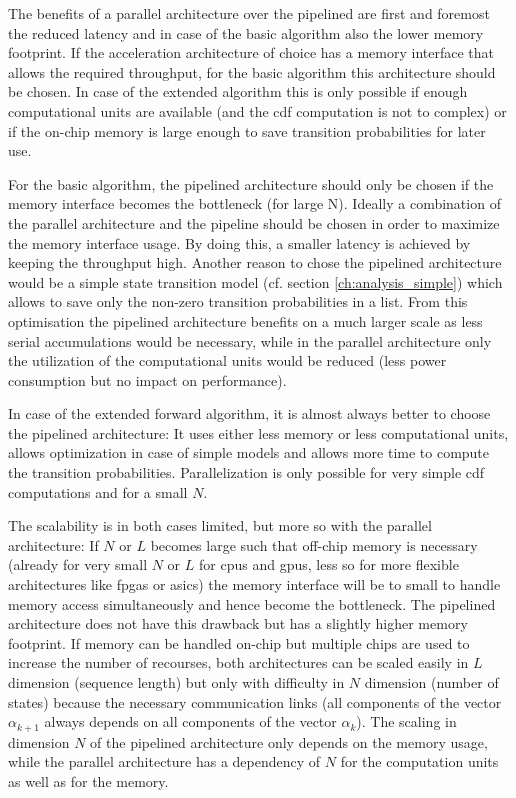 \documentclass[mscthesis]{usiinfthesis}
\begin{document}
The benefits of a parallel architecture over the pipelined are first and
foremost the reduced latency and in case of the basic algorithm also the lower
memory footprint. If the acceleration architecture of choice has a memory
interface that allows the required throughput, for the basic algorithm this
architecture should be chosen. In case of the extended algorithm this is only
possible if enough computational units are available (and the \gls{cdf} computation
is not to complex) or if the on-chip memory is large enough to save transition
probabilities for later use.

For the basic algorithm, the pipelined architecture should only be chosen if
the memory interface becomes the bottleneck (for large N). Ideally
a combination of the parallel architecture and the pipeline should be chosen in
order to maximize the memory interface usage. By doing this, a smaller latency
is achieved by keeping the throughput high. Another reason to chose the
pipelined architecture would be a simple state transition model (cf. section
\ref{ch:analysis_simple}) which allows to save only the non-zero transition
probabilities in a list. From this optimisation the pipelined architecture
benefits on a much larger scale as less serial accumulations would be
necessary, while in the parallel architecture only the utilization of the
computational units would be reduced (less power consumption but no impact on
performance).

In case of the extended forward algorithm, it is almost always better to choose
the pipelined architecture: It uses either less memory or less computational
units, allows optimization in case of simple models and allows more time to
compute the transition probabilities. Parallelization is only possible for very
simple \gls{cdf} computations and for a small $N$.

The scalability is in both cases limited, but more so with the parallel
architecture: If $N$ or $L$ becomes large such that
off-chip memory is necessary (already for very small $N$ or $L$ for \glspl{cpu} and
\glspl{gpu}, less so for more flexible architectures like \glspl{fpga} or \glspl{asic}) the memory
interface will be to small to handle memory access simultaneously and hence
become the bottleneck. The pipelined architecture does not have this drawback
but has a slightly higher memory footprint. If memory can be handled on-chip but
multiple chips are used to increase the number of recourses, both
architectures can be scaled easily in $L$ dimension (sequence length) but only
with difficulty in $N$ dimension (number of states) because the necessary
communication links (all components of the vector $\alpha_{k+1}$ always depends
on all components of the vector $\alpha_k$). The scaling in dimension $N$ of the
pipelined architecture only depends on the memory usage, while the parallel
architecture has a dependency of $N$ for the computation units as well as for
the memory.
\end{document}
